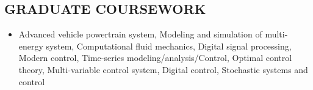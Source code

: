 \documentclass[margin, 9pt]{res} %
\begin{document}
\begin{resume}
\section{GRADUATE COURSEWORK}

\vspace*{-1pt}
\begin{itemize}[leftmargin=*] \itemsep -2pt
	\item Advanced vehicle powertrain system, Modeling and simulation of multi-energy system, Computational fluid mechanics, Digital signal processing, Modern control, Time-series modeling/analysis/Control, Optimal control theory, Multi-variable control system, Digital control, Stochastic systems and control
\end{itemize}


\end{resume}
\end{document}
